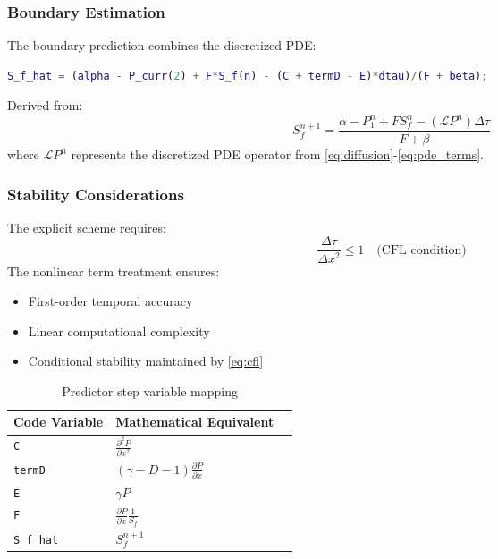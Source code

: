 \documentclass[12pt]{article}
\begin{document}
\subsubsection{Boundary Estimation}
The boundary prediction combines the discretized PDE:

\begin{lstlisting}[language=Matlab,caption={Boundary predictor},label=code:boundary_pred]
S_f_hat = (alpha - P_curr(2) + F*S_f(n) - (C + termD - E)*dtau)/(F + beta);
\end{lstlisting}

Derived from:
\begin{equation}
S_f^{n+1} = \frac{\alpha - P_1^n + F S_f^n - (\mathcal{L}P^n)\Delta\tau}{F + \beta} \label{eq:boundary_update}
\end{equation}
where \(\mathcal{L}P^n\) represents the discretized PDE operator from \eqref{eq:diffusion}-\eqref{eq:pde_terms}.

\subsubsection{Stability Considerations}
The explicit scheme requires:
\begin{equation}
\frac{\Delta\tau}{\Delta x^2} \leq 1 \quad \text{(CFL condition)} \label{eq:cfl}
\end{equation}
The nonlinear term treatment ensures:
\begin{itemize}
\item First-order temporal accuracy
\item Linear computational complexity
\item Conditional stability maintained by \eqref{eq:cfl}
\end{itemize}

\begin{table}[h]
\centering
\caption{Predictor step variable mapping}
\begin{tabular}{lll}
\hline
Code Variable & Mathematical Equivalent\\ \hline
\texttt{C} & \(\frac{\partial^2 P}{\partial x^2}\) \\
\texttt{termD} & \((\gamma-D-1)\frac{\partial P}{\partial x}\) \\
\texttt{E} & \(\gamma P\) \\
\texttt{F} & \(\frac{\partial P}{\partial x}\frac{1}{S_f}\)\\
\texttt{S\_f\_hat} & \(S_f^{n+1}\)\\ \hline
\end{tabular}
\end{table}
\end{document}
